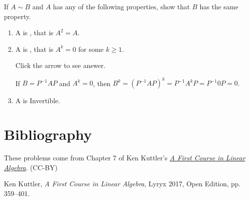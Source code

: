 \documentclass{ximera}
\begin{document}
\begin{problem}\label{prob:moresimilarproperties}
If $A \sim B$ and $A$ has any of the following properties, show that $B$ has the same property.

\begin{enumerate}
\item\label{prob:moresimilarproperties_idempotent} A is , that is $A^{2} = A$.

\item\label{prob:moresimilarproperties_nilpotent} A is , that is $A^{k} = 0$ for some $k \geq 1$.

Click the arrow to see answer.
\begin{expandable}
If $B = P^{-1}AP$ and $A^{k} = 0$, then $B^{k} = (P^{-1}AP)^{k} = P^{-1}A^{k}P = P^{-1}0P = 0$.
\end{expandable}

\item\label{prob:moresimilarproperties_invertible} A is Invertible.

\end{enumerate}

\end{problem}

\section*{Bibliography}
These problems come from Chapter 7 of Ken Kuttler's \href{https://open.umn.edu/opentextbooks/textbooks/a-first-course-in-linear-algebra-2017}{\it A First Course in Linear Algebra}. (CC-BY)

Ken Kuttler, {\it  A First Course in Linear Algebra}, Lyryx 2017, Open Edition, pp. 359--401. 
\end{document}
